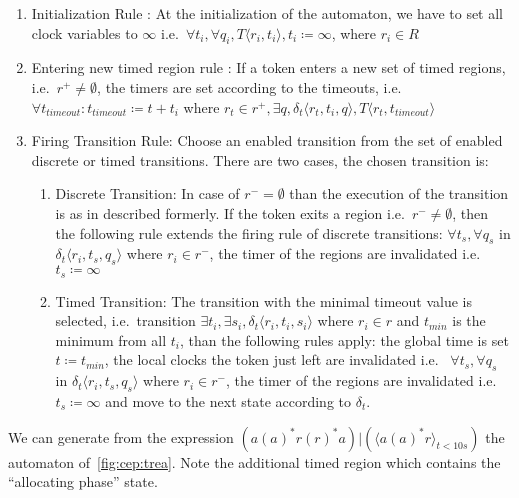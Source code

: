 			\begin{enumerate}
				\item Initialization Rule : At the initialization  of the automaton, we have to set all clock variables to $\infty$ 
				i.e.~$\forall t_i, \forall q_i, T \langle r_i, t_i \rangle, t_i \coloneqq \infty $, where $r_i \in R$
				
				\item Entering new timed region rule :
				If a token enters a new set of timed regions, 
				i.e.~$r^+ \neq \emptyset$, 
				the timers are set according to the timeouts, 
				i.e.~$\forall t_{\textit{timeout}} : t_{\textit{timeout}} \coloneqq t + t_i $ where $ r_t \in r^+, \exists q ,\delta_t\langle  r_t,t_i,q \rangle, T \langle r_t, t_{\textit{timeout}} \rangle$
				
				\item Firing Transition Rule: Choose an enabled transition from the set of enabled discrete or timed transitions. 
				There are two cases, the chosen transition is:
				\begin{enumerate}
					\item Discrete Transition: In case of $r^- = \emptyset$ than the execution of the transition is as in described formerly. 
					If the token exits a region i.e.~$r^- \neq \emptyset$, 
					then the following rule extends the firing rule of discrete transitions:
					$\forall t_s, \forall q_s$ in $ \delta_t \langle r_i, t_s, q_s \rangle$ where $r_i \in r^-$, the timer of the regions are invalidated i.e.~	$t_s \coloneqq \infty$
					\item Timed Transition: The transition with the minimal timeout value is selected, 
					i.e.~transition $\exists t_i, \exists s_i, \delta_t \langle r_i, t_i, s_i \rangle$ where $ r_i \in r$ and $t_{\textit{min}}$ is the minimum from all $t_i$,
					than the following rules apply:
					the global time is set $t \coloneqq t_{\textit{min}}$, 
					the local clocks the token just left are invalidated i.e.~
					$\forall t_s, \forall q_s$ in $ \delta_t \langle r_i, t_s, q_s \rangle$ where $r_i \in r^-$, the timer of the regions are invalidated i.e.~$t_s \coloneqq \infty$ 
					and move to the next state according to $\delta_t$.
				\end{enumerate}			
			\end{enumerate}
			
			
			We can generate from the expression $(a (a)^\ast r (r)^\ast a)|( \langle a (a)^\ast r \rangle_{t < 10 s})$ the automaton of~\cref{fig:cep:trea}.
			Note the additional timed region which contains the ``allocating phase'' state.
			
